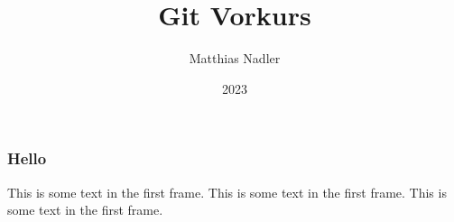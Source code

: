 \documentclass{beamer}
\title{Git Vorkurs}
\author{Matthias Nadler}
\institute{Uni Basel}
\date{2023}
\begin{document}
\frame{\titlepage}

\begin{frame}
\frametitle{Hello}
This is some text in the first frame. This is some text in the first frame. This is some text in the first frame.
\end{frame}
\end{document}
